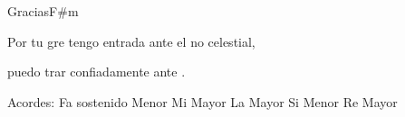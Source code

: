 \documentclass[12pt, spanish]{book}
\begin{document}
\begin{song}{Gracias}{F\#m}
\begin{SBOpGroup}
            Por tu gre tengo entrada ante el no celestial,

            puedo trar confiadamente ante .
        \end{SBOpGroup}

        \ifChordBk
        \begin{SBOpGroup}
            Acordes:
            \upchord{\Fsm}\qquad Fa sostenido Menor \hfill
            \upchord{\E}\qquad Mi Mayor \hfill\null\break
            \upchord{\A}\qquad La Mayor \hfill
            \upchord{\Bm}\qquad Si Menor \hfill\null\break
            \upchord{\D}\qquad Re Mayor \hfill
        \end{SBOpGroup}
        \fi
    \end{song}

%
%
%
%
%
%
%
%
%
%
\end{document}
